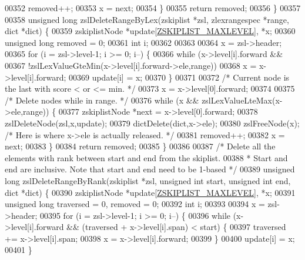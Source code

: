 \begin{DoxyCode}
00352         removed++;
00353         x = next;
00354     \}
00355     \textcolor{keywordflow}{return} removed;
00356 \}
00357 
00358 \textcolor{keywordtype}{unsigned} \textcolor{keywordtype}{long} zslDeleteRangeByLex(zskiplist *zsl, zlexrangespec *range, dict *dict) \{
00359     zskiplistNode *update[\hyperlink{server_8h_a36822e3ce2740c64859068fd849e227b}{ZSKIPLIST\_MAXLEVEL}], *x;
00360     \textcolor{keywordtype}{unsigned} \textcolor{keywordtype}{long} removed = 0;
00361     \textcolor{keywordtype}{int} i;
00362 
00363 
00364     x = zsl->header;
00365     \textcolor{keywordflow}{for} (i = zsl->level-1; i >= 0; i--) \{
00366         \textcolor{keywordflow}{while} (x->level[i].forward &&
00367             !zslLexValueGteMin(x->level[i].forward->ele,range))
00368                 x = x->level[i].forward;
00369         update[i] = x;
00370     \}
00371 
00372     \textcolor{comment}{/* Current node is the last with score < or <= min. */}
00373     x = x->level[0].forward;
00374 
00375     \textcolor{comment}{/* Delete nodes while in range. */}
00376     \textcolor{keywordflow}{while} (x && zslLexValueLteMax(x->ele,range)) \{
00377         zskiplistNode *next = x->level[0].forward;
00378         zslDeleteNode(zsl,x,update);
00379         dictDelete(dict,x->ele);
00380         zslFreeNode(x); \textcolor{comment}{/* Here is where x->ele is actually released. */}
00381         removed++;
00382         x = next;
00383     \}
00384     \textcolor{keywordflow}{return} removed;
00385 \}
00386 
00387 \textcolor{comment}{/* Delete all the elements with rank between start and end from the skiplist.}
00388 \textcolor{comment}{ * Start and end are inclusive. Note that start and end need to be 1-based */}
00389 \textcolor{keywordtype}{unsigned} \textcolor{keywordtype}{long} zslDeleteRangeByRank(zskiplist *zsl, \textcolor{keywordtype}{unsigned} \textcolor{keywordtype}{int} start, \textcolor{keywordtype}{unsigned} \textcolor{keywordtype}{int} end, dict *dict) \{
00390     zskiplistNode *update[\hyperlink{server_8h_a36822e3ce2740c64859068fd849e227b}{ZSKIPLIST\_MAXLEVEL}], *x;
00391     \textcolor{keywordtype}{unsigned} \textcolor{keywordtype}{long} traversed = 0, removed = 0;
00392     \textcolor{keywordtype}{int} i;
00393 
00394     x = zsl->header;
00395     \textcolor{keywordflow}{for} (i = zsl->level-1; i >= 0; i--) \{
00396         \textcolor{keywordflow}{while} (x->level[i].forward && (traversed + x->level[i].span) < start) \{
00397             traversed += x->level[i].span;
00398             x = x->level[i].forward;
00399         \}
00400         update[i] = x;
00401     \}

\end{DoxyCode}
